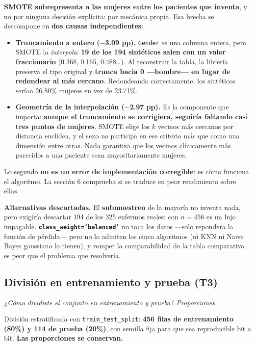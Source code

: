 \documentclass[10pt,a4paper]{article}
\begin{document}
\textbf{SMOTE subrepresenta a las mujeres entre los pacientes que inventa}, y no por ninguna decisión explícita: por mecánica propia. Esa brecha se descompone en \textbf{dos causas independientes}:

\begin{itemize}
\item \textbf{Truncamiento a entero ($-$3.09 pp).} \texttt{Gender} es una columna entera, pero SMOTE la \textit{interpola}: \textbf{19 de los 194 sintéticos salen con un valor fraccionario} (0.368, 0.165, 0.488\dots). Al reconstruir la tabla, la librería preserva el tipo original y \textbf{trunca hacia 0 ---hombre--- en lugar de redondear al más cercano}. Redondeando correctamente, los sintéticos serían 26.80\% mujeres en vez de 23.71\%.
\item \textbf{Geometría de la interpolación ($-$2.97 pp).} Es la componente que importa: \textbf{aunque el truncamiento se corrigiera, seguiría faltando casi tres puntos de mujeres}. SMOTE elige los $k$ vecinos más cercanos por distancia euclídea, y el sexo no participa en ese criterio más que como una dimensión entre otras. Nada garantiza que los vecinos clínicamente más parecidos a una paciente sean mayoritariamente mujeres.
\end{itemize}

Lo segundo \textbf{no es un error de implementación corregible}: es cómo funciona el algoritmo. La sección 6 comprueba si se traduce en peor rendimiento sobre ellas.

\textbf{Alternativas descartadas.} El \textbf{submuestreo} de la mayoría no inventa nada, pero exigiría descartar 194 de los 325 enfermos reales: con $n=456$ es un lujo impagable. \textbf{\texttt{class\_weight='balanced'}} no toca los datos ---solo repondera la función de pérdida--- pero no lo admiten los cinco algoritmos (ni KNN ni Naive Bayes gaussiano lo tienen), y romper la comparabilidad de la tabla comparativa es peor que el problema que resolvería.

\subsection{División en entrenamiento y prueba (T3)}

\textit{¿Cómo dividiste el conjunto en entrenamiento y prueba? Proporciones.}

División estratificada con \texttt{train\_test\_split}: \textbf{456 filas de entrenamiento (80\%) y 114 de prueba (20\%)}, con semilla fija para que sea reproducible bit a bit. \textbf{Las proporciones se conservan.}
\end{document}
